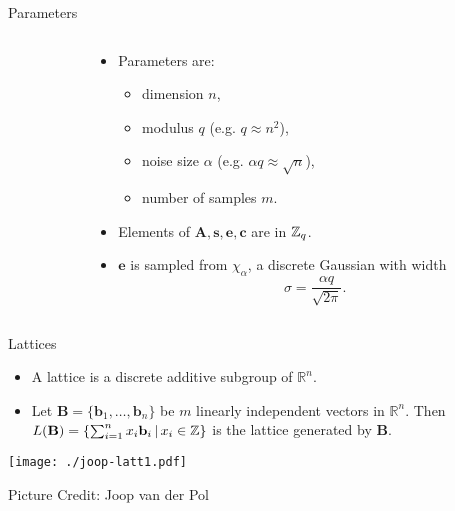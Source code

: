 \documentclass[presentation,smaller]{beamer}
\newcommand{\ZZ}[1][blank]{\ensuremath{\ifthenelse{\equal{#1}{blank}}{\mathbb{Z}}{\mathbb{Z}\left[#1\right]}\xspace}}
\renewcommand{\vec}[1]{\ensuremath{\mathbf{#1}}\xspace}
\begin{document}
\begin{frame}[label={sec:orgheadline8}]{Parameters}
\begin{columns}
\begin{column}{0.5\columnwidth}
\end{column}


\begin{column}{0.5\columnwidth}
\begin{itemize}
\item Parameters are: 
\begin{itemize}
\item dimension \(n\),
\item modulus \(q\) (e.g. \(q \approx n^2\)),
\item noise size \(\alpha\) (e.g. \(\alpha q \approx \sqrt{n}\)),
\item number of samples \(m\).
\end{itemize}

\item Elements of \(\vec{A}, \vec{s}, \vec{e}, \vec{c}\) are in \(\ZZ_q\).
\item \(\vec{e}\) is sampled from \(χ_{α}\), a discrete Gaussian with width \[\sigma=\frac{\alpha q}{\sqrt{2 \pi}}.\]
\end{itemize}
\end{column}
\end{columns}
\end{frame}


\begin{frame}[label={sec:orgheadline9}]{Lattices}
\begin{itemize}
\item A lattice is a discrete additive subgroup of \(\mathbb{R}^n\).

\item Let \(\vec{B} = \{ \vec{b}_1, \ldots, \vec{b}_n \}\) be \(m\) linearly independent vectors in \(\mathbb{R}^n\). Then \(L(\vec{B})=\{ \sum_{i=1}^{n} x_i \vec{b}_i \,|\, x_i \in \ZZ\}\) is the lattice generated by \(\vec{B}\).
\end{itemize}

\texttt{[image: ./joop-latt1.pdf]}

\tiny Picture Credit: Joop van der Pol
\end{frame}
\end{document}
